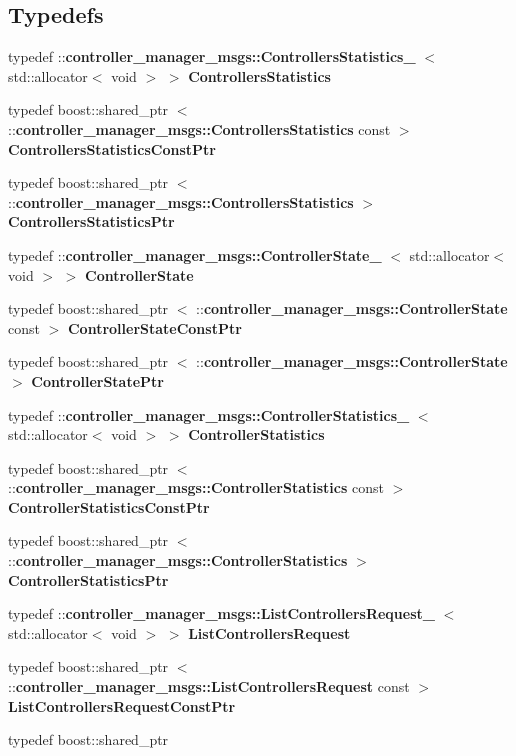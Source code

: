 \subsection*{\-Typedefs}
\begin{DoxyCompactItemize}
\item 
typedef \*
\-::{\bf controller\-\_\-manager\-\_\-msgs\-::\-Controllers\-Statistics\-\_\-}\*
$<$ std\-::allocator$<$ void $>$ $>$ {\bf \-Controllers\-Statistics}
\item 
typedef boost\-::shared\-\_\-ptr\*
$<$ \-::{\bf controller\-\_\-manager\-\_\-msgs\-::\-Controllers\-Statistics} \*
const  $>$ {\bf \-Controllers\-Statistics\-Const\-Ptr}
\item 
typedef boost\-::shared\-\_\-ptr\*
$<$ \-::{\bf controller\-\_\-manager\-\_\-msgs\-::\-Controllers\-Statistics} $>$ {\bf \-Controllers\-Statistics\-Ptr}
\item 
typedef \*
\-::{\bf controller\-\_\-manager\-\_\-msgs\-::\-Controller\-State\-\_\-}\*
$<$ std\-::allocator$<$ void $>$ $>$ {\bf \-Controller\-State}
\item 
typedef boost\-::shared\-\_\-ptr\*
$<$ \-::{\bf controller\-\_\-manager\-\_\-msgs\-::\-Controller\-State} \*
const  $>$ {\bf \-Controller\-State\-Const\-Ptr}
\item 
typedef boost\-::shared\-\_\-ptr\*
$<$ \-::{\bf controller\-\_\-manager\-\_\-msgs\-::\-Controller\-State} $>$ {\bf \-Controller\-State\-Ptr}
\item 
typedef \*
\-::{\bf controller\-\_\-manager\-\_\-msgs\-::\-Controller\-Statistics\-\_\-}\*
$<$ std\-::allocator$<$ void $>$ $>$ {\bf \-Controller\-Statistics}
\item 
typedef boost\-::shared\-\_\-ptr\*
$<$ \-::{\bf controller\-\_\-manager\-\_\-msgs\-::\-Controller\-Statistics} \*
const  $>$ {\bf \-Controller\-Statistics\-Const\-Ptr}
\item 
typedef boost\-::shared\-\_\-ptr\*
$<$ \-::{\bf controller\-\_\-manager\-\_\-msgs\-::\-Controller\-Statistics} $>$ {\bf \-Controller\-Statistics\-Ptr}
\item 
typedef \*
\-::{\bf controller\-\_\-manager\-\_\-msgs\-::\-List\-Controllers\-Request\-\_\-}\*
$<$ std\-::allocator$<$ void $>$ $>$ {\bf \-List\-Controllers\-Request}
\item 
typedef boost\-::shared\-\_\-ptr\*
$<$ \-::{\bf controller\-\_\-manager\-\_\-msgs\-::\-List\-Controllers\-Request} \*
const  $>$ {\bf \-List\-Controllers\-Request\-Const\-Ptr}
\item 
typedef boost\-::shared\-\_\-ptr\*

\end{DoxyCompactItemize}
